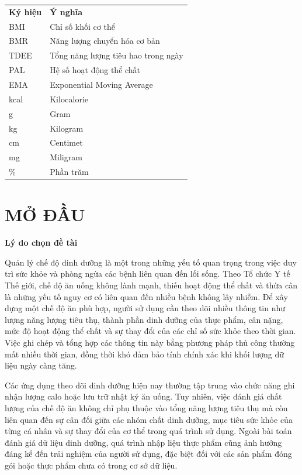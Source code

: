 \documentclass[12pt, a4paper]{report}
\begin{document}
\noindent
\begin{tabular}{>{\raggedright\arraybackslash}p{3cm} p{11cm}}
\textbf{Ký hiệu} & \textbf{Ý nghĩa} \\[0.2cm]
BMI & Chỉ số khối cơ thể \\[0.15cm]
BMR & Năng lượng chuyển hóa cơ bản \\[0.15cm]
TDEE & Tổng năng lượng tiêu hao trong ngày \\[0.15cm]
PAL & Hệ số hoạt động thể chất \\[0.15cm]
EMA & Exponential Moving Average \\[0.15cm]
kcal & Kilocalorie \\[0.15cm]
g & Gram \\[0.15cm]
kg & Kilogram \\[0.15cm]
cm & Centimet \\[0.15cm]
mg & Miligram \\[0.15cm]
\% & Phần trăm \\
\end{tabular}
\clearpage
{}

\chapter*{MỞ ĐẦU}
\textbf{Lý do chọn đề tài}

Quản lý chế độ dinh dưỡng là một trong những yếu tố quan trọng trong việc duy trì sức khỏe và phòng ngừa các bệnh liên quan đến lối sống. Theo Tổ chức Y tế Thế giới, chế độ ăn uống không lành mạnh, thiếu hoạt động thể chất và thừa cân là những yếu tố nguy cơ có liên quan đến nhiều bệnh không lây nhiễm. Để xây dựng một chế độ ăn phù hợp, người sử dụng cần theo dõi nhiều thông tin như lượng năng lượng tiêu thụ, thành phần dinh dưỡng của thực phẩm, cân nặng, mức độ hoạt động thể chất và sự thay đổi của các chỉ số sức khỏe theo thời gian. Việc ghi chép và tổng hợp các thông tin này bằng phương pháp thủ công thường mất nhiều thời gian, đồng thời khó đảm bảo tính chính xác khi khối lượng dữ liệu ngày càng tăng.

Các ứng dụng theo dõi dinh dưỡng hiện nay thường tập trung vào chức năng ghi nhận lượng calo hoặc lưu trữ nhật ký ăn uống. Tuy nhiên, việc đánh giá chất lượng của chế độ ăn không chỉ phụ thuộc vào tổng năng lượng tiêu thụ mà còn liên quan đến sự cân đối giữa các nhóm chất dinh dưỡng, mục tiêu sức khỏe của từng cá nhân và sự thay đổi của cơ thể trong quá trình sử dụng. Ngoài bài toán đánh giá dữ liệu dinh dưỡng, quá trình nhập liệu thực phẩm cũng ảnh hưởng đáng kể đến trải nghiệm của người sử dụng, đặc biệt đối với các sản phẩm đóng gói hoặc thực phẩm chưa có trong cơ sở dữ liệu.
\end{document}
